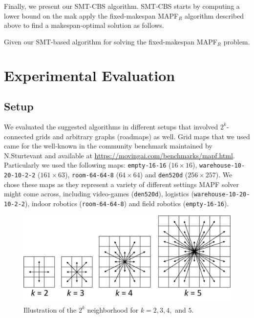 \documentclass[review]{elsarticle}
\newcommand{\mapfr}{\ac{MAPF}$_R$\xspace}
\newcommand{\smtcbs}{SMT-CBS\xspace}
\newcommand{\mapf}{\ac{MAPF}\xspace}
\begin{document}
Finally, we present our \smtcbs algorithm. 
\smtcbs starts by computing a lower bound on the mak
 apply the fixed-makespan \mapfr algorithm described above to find a makespan-optimal solution as follows. 


Given our SMT-based algorithm for solving the fixed-makespan \mapfr problem. 


\section{Experimental Evaluation}
\subsection{Setup}
We evaluated the suggested algorithms in different setups that involved $2^k$-connected grids \cite{rivera2017grid} and arbitrary graphs (roadmaps) as well. Grid maps that we used came for the well-known in the community benchmark maintained by N.Sturtevant \cite{stern2019mapf} and available at \url{https://movingai.com/benchmarks/mapf.html}. Particularly we used the following maps: \texttt{empty-16-16} ($16 \times 16$), \texttt{warehouse-10-20-10-2-2} ($161 \times 63$), \texttt{room-64-64-8} ($64 \times 64$) and \texttt{den520d} ($256 \times 257$). We chose these maps as they represent a variety of different settings \mapf solver might come across, including video-games (\texttt{den520d}), logistics (\texttt{warehouse-10-20-10-2-2}), indoor robotics (\texttt{room-64-64-8}) and field robotics (\texttt{empty-16-16}).

\begin{figure}
\centering
    \centering
    \includegraphics[width=0.75\columnwidth]{2k-neighborhood.png}
    \caption{Illustration of the $2^k$ neighborhood for $k=2,3,4,$ and $5$.}
    \label{fig:2k-grids}
\end{figure}
\end{document}
